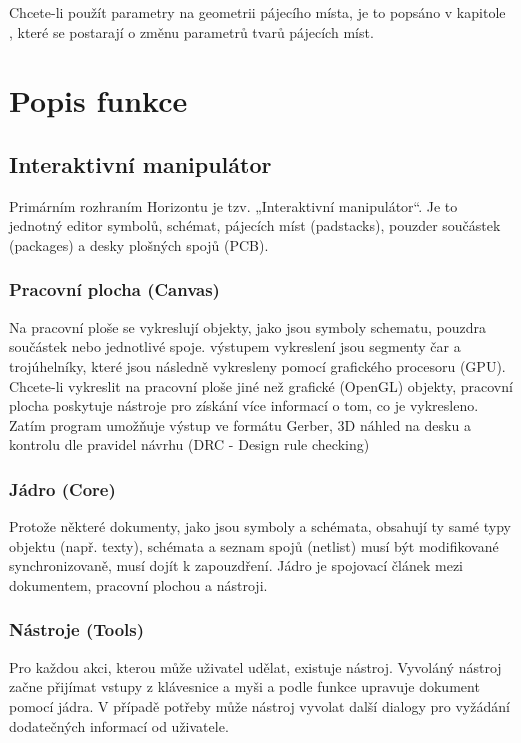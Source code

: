 \documentclass[letterpaper,10pt,czech]{sphinxmanual}
\begin{document}
Chcete-li použít parametry na geometrii pájecího místa, je to popsáno v kapitole {\hyperref[\detokenize{parameter-programs_cz::doc}]{}}, které se postarají o změnu parametrů tvarů pájecích míst.


\chapter{Popis funkce}
\label{\detokenize{theory-of-operation_cz:popis-funkce}}\label{\detokenize{theory-of-operation_cz::doc}}

\section{Interaktivní manipulátor}
\label{\detokenize{theory-of-operation_cz:interaktivni-manipulator}}
Primárním rozhraním Horizontu je tzv. „Interaktivní manipulátor“.
Je to jednotný editor symbolů, schémat, pájecích míst (padstacks),
pouzder součástek (packages) a desky plošných spojů (PCB).


\subsection{Pracovní plocha (Canvas)}
\label{\detokenize{theory-of-operation_cz:pracovni-plocha-canvas}}
Na pracovní ploše se vykreslují objekty, jako jsou symboly schematu, pouzdra součástek nebo jednotlivé spoje.
výstupem vykreslení jsou segmenty čar a trojúhelníky, které jsou následně vykresleny pomocí grafického procesoru (GPU).
Chcete-li vykreslit na pracovní ploše jiné než grafické (OpenGL) objekty,
pracovní plocha poskytuje nástroje pro získání více informací o tom, co je
vykresleno. Zatím program umožňuje výstup ve formátu Gerber, 3D náhled na desku a kontrolu dle pravidel návrhu
(DRC - Design rule checking)


\subsection{Jádro (Core)}
\label{\detokenize{theory-of-operation_cz:jadro-core}}
Protože některé dokumenty, jako jsou symboly a schémata, obsahují ty samé
typy objektu (např. texty), schémata a seznam spojů (netlist) musí být
modifikované synchronizovaně, musí dojít k zapouzdření. Jádro je
spojovací článek mezi dokumentem, pracovní plochou a nástroji.


\subsection{Nástroje (Tools)}
\label{\detokenize{theory-of-operation_cz:nastroje-tools}}
Pro každou akci, kterou může uživatel udělat, existuje nástroj. Vyvoláný nástroj začne
přijímat vstupy z klávesnice a myši a podle funkce upravuje dokument
pomocí jádra. V případě potřeby může nástroj vyvolat další
dialogy pro vyžádání dodatečných informací od uživatele.
\end{document}
